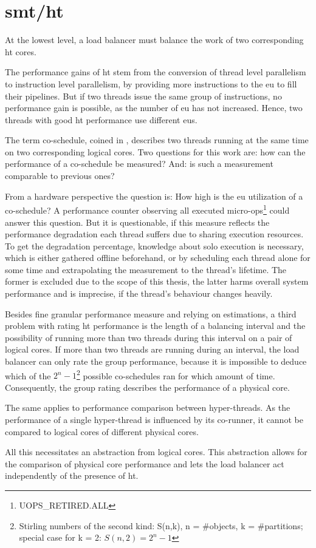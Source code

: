 \section{\gls{smt}/\gls{ht}}
\label{design:smt}


At the lowest level, a load balancer must balance the work of two corresponding
\gls{ht} cores.

The performance gains of \gls{ht} stem from the conversion of thread level
parallelism to instruction level parallelism, by providing more instructions to
the \gls{eu} to fill their pipelines.
But if two threads issue the same group of instructions, no performance gain is
possible, as the number of \gls{eu} has not increased.
Hence, two threads with good \gls{ht} performance use different \gls{eu}s.

The term co-schedule, coined in \cite{snavely_symbiotic_2000}, describes two
threads running at the same time on two corresponding logical cores.
Two questions for this work are: how can the performance of a co-schedule be
measured? And: is such a measurement comparable to previous ones?

From a hardware perspective the question is: How high is the \gls{eu}
utilization of a co-schedule?
A performance counter observing all executed
micro-ops\footnote{UOPS\_RETIRED.ALL} could answer this question.
But it is questionable, if this measure reflects the performance
degradation each thread suffers due to sharing execution resources.
To get the degradation percentage, knowledge about solo execution is necessary,
which is either gathered offline beforehand, or by scheduling each thread alone
for some time and extrapolating the measurement to the thread's lifetime.
The former is excluded due to the scope of this thesis, the latter harms
overall system performance and is imprecise, if the thread's behaviour changes
heavily.

Besides fine granular performance measure and relying on estimations, a third
problem with rating \gls{ht} performance is the length of a balancing interval
and the possibility of running more than two threads during this interval on a
pair of logical cores.
If more than two threads are running during an interval, the load balancer can
only rate the group performance, because it is impossible to deduce which
of the
$2^n-1$\footnote{Stirling numbers of the second kind: S(n,k), n = \#objects, k =
\#partitions;\\special case for k = 2: $S(n,2) = 2^n-1$}
possible co-schedules ran for which amount of time.
Consequently, the group rating describes the performance of a physical core.

The same applies to performance comparison between hyper-threads. As the
performance of a single hyper-thread is influenced by its co-runner, it cannot
be compared to logical cores of different physical cores.

All this necessitates an abstraction from logical cores.
This abstraction allows for the comparison of physical core performance and
lets the load balancer act independently of the presence of \gls{ht}.
